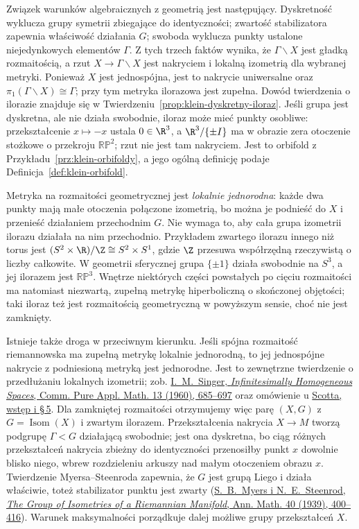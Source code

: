 Związek warunków algebraicznych z geometrią jest następujący.
Dyskretność wyklucza grupy symetrii zbiegające do identyczności;
zwartość stabilizatora zapewnia właściwość działania $G$;
swoboda wyklucza punkty ustalone niejedynkowych elementów $\Gamma$.
Z tych trzech faktów wynika, że $\Gamma\backslash X$ jest gładką
rozmaitością, a rzut $X\to\Gamma\backslash X$ jest nakryciem i lokalną
izometrią dla wybranej metryki. Ponieważ $X$ jest jednospójna,
jest to nakrycie uniwersalne oraz
$\pi_1(\Gamma\backslash X)\cong\Gamma$; przy tym metryka ilorazowa
jest zupełna. Dowód twierdzenia o ilorazie znajduje się w
Twierdzeniu~\ref{prop:klein-dyskretny-iloraz}.
Jeśli grupa jest dyskretna, ale nie działa swobodnie,
iloraz może mieć punkty osobliwe: przekształcenie
$x\mapsto-x$ ustala $0\in\R^3$, a $\R^3/\{\pm I\}$
ma w obrazie zera otoczenie stożkowe o przekroju
$\mathbb{RP}^2$; rzut nie jest tam nakryciem. Jest to orbifold
z Przykładu~\ref{prz:klein-orbifoldy}, a jego ogólną definicję
podaje Definicja~\ref{def:klein-orbifold}.

Metryka na rozmaitości geometrycznej jest \emph{lokalnie
jednorodna}: każde dwa punkty mają małe otoczenia połączone
izometrią, bo można je podnieść do $X$ i przenieść działaniem
przechodnim $G$. Nie wymaga to, aby cała grupa izometrii ilorazu
działała na nim przechodnio. Przykładem zwartego ilorazu innego
niż torus jest $(S^2\times\R)/\Z\cong S^2\times S^1$,
gdzie $\Z$ przesuwa współrzędną rzeczywistą o liczby całkowite.
W geometrii sferycznej grupa $\{\pm1\}$ działa swobodnie
na $S^3$, a jej ilorazem jest $\mathbb{RP}^3$.
Wnętrze niektórych części powstałych po cięciu rozmaitości
ma natomiast niezwartą, zupełną metrykę hiperboliczną
o skończonej objętości; taki iloraz też jest rozmaitością
geometryczną w powyższym sensie, choć nie jest zamknięty.

Istnieje także droga w przeciwnym kierunku. Jeśli spójna
rozmaitość riemannowska ma zupełną metrykę lokalnie jednorodną,
to jej jednospójne nakrycie z podniesioną metryką jest jednorodne.
Jest to zewnętrzne twierdzenie o przedłużaniu lokalnych izometrii;
zob. \href{https://doi.org/10.1002/cpa.3160130408}
{I.\ M.\ Singer, \emph{Infinitesimally Homogeneous Spaces},
Comm. Pure Appl. Math. 13 (1960), 685--697} oraz omówienie
u \href{https://sschleimer.warwick.ac.uk/Teach/2021_3MFDS/References/1983the_geometries_of_three-manifolds.pdf}
{Scotta, wstęp i \S\,5}. Dla zamkniętej rozmaitości otrzymujemy
więc parę $(X,G)$ z $G=\operatorname{Isom}(X)$ i zwartym ilorazem.
Przekształcenia nakrycia $X\to M$ tworzą podgrupę
$\Gamma<G$ działającą swobodnie; jest ona dyskretna,
bo ciąg różnych przekształceń nakrycia zbieżny do identyczności
przenosiłby punkt $x$ dowolnie blisko niego, wbrew rozdzieleniu
arkuszy nad małym otoczeniem obrazu $x$.
Twierdzenie Myersa--Steenroda zapewnia, że $G$ jest grupą Liego
i działa właściwie, toteż stabilizator punktu jest zwarty
(\href{https://doi.org/10.2307/1968928}
{S.\ B.\ Myers i N.\ E.\ Steenrod,
\emph{The Group of Isometries of a Riemannian Manifold},
Ann. Math. 40 (1939), 400--416}). Warunek maksymalności
porządkuje dalej możliwe grupy przekształceń $X$.

